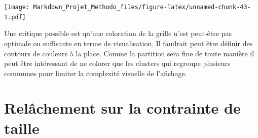 \documentclass[
]{article}
\begin{document}
\texttt{[image: Markdown\_Projet\_Methodo\_files/figure-latex/unnamed-chunk-43-1.pdf]}

Une critique possible est qu'une coloration de la grille n'est peut-être
pas optimale ou suffisante en terme de visualisation. Il faudrait peut
être définir des contours de couleurs à la place. Comme la partition
sera fine de toute manière il peut être intéressant de ne colorer que
les clusters qui regroupe plusieurs communes pour limiter la complexité
visuelle de l'afichage.

\hypertarget{reluxe2chement-sur-la-contrainte-de-taille}{%
\section{Relâchement sur la contrainte de
taille}\label{reluxe2chement-sur-la-contrainte-de-taille}}
\end{document}
